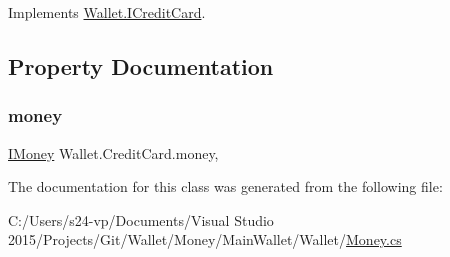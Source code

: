Implements \hyperlink{interface_wallet_1_1_i_credit_card_a8b7eadc0c901e4560f244d28b59e32bf}{Wallet.\+I\+Credit\+Card}.



\subsection{Property Documentation}
\hypertarget{class_wallet_1_1_credit_card_a849874792e92f41ee08da2ee2045aa55}{}\label{class_wallet_1_1_credit_card_a849874792e92f41ee08da2ee2045aa55} 
\subsubsection{\texorpdfstring{money}{money}}
{\footnotesize\ttfamily \hyperlink{interface_wallet_1_1_i_money}{I\+Money} Wallet.\+Credit\+Card.\+money\hspace{0.3cm}{\ttfamily [get]}, {\ttfamily [set]}}



The documentation for this class was generated from the following file\+:\begin{DoxyCompactItemize}
\item 
C\+:/\+Users/s24-\/vp/\+Documents/\+Visual Studio 2015/\+Projects/\+Git/\+Wallet/\+Money/\+Main\+Wallet/\+Wallet/\hyperlink{_money_8cs}{Money.\+cs}\end{DoxyCompactItemize}
